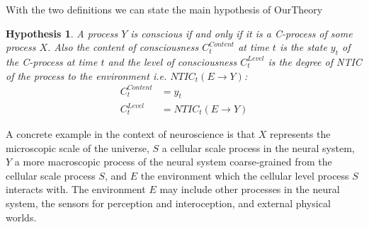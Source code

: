 \documentclass[utf8]{article}
\newtheorem*{hypothesis}{Hypothesis}
\begin{document}
        With the two definitions we can state the main hypothesis of \ac{OurTheory}
        \begin{hypothesis}
        A process $Y$ is conscious if and only if it is a C-process of some process $X$. Also the content of consciousness $C_t^{Content}$ at time $t$ is the state $y_t$ of the C-process at time $t$ and the level of consciousness $C_t^{Level}$ is the degree of NTIC of the process to the environment i.e. $NTIC_t(E\rightarrow Y)$:
        \begin{align}
            C_t^{Content} &= y_t \label{eq:cContent}\\
            C_t^{Level} &= NTIC_t(E\rightarrow Y) \label{eq:cLevel}
        \end{align}
        \end{hypothesis}       


        A concrete example in the context of neuroscience is that $X$ represents the microscopic scale of the universe, $S$ a cellular scale process in the neural system, $Y$ a more macroscopic process of the neural system coarse-grained from the cellular scale process $S$, and $E$ the environment which the cellular level process $S$ interacts with.  The environment $E$ may include other processes in the neural system, the sensors for perception and interoception, and external physical worlds.\\
        
\end{document}
